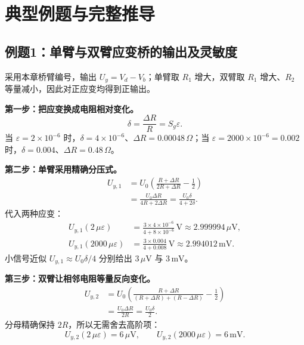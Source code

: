 \clearpage
\section{典型例题与完整推导}
\label{sec:ch5-worked-examples}

\subsection{例题1：单臂与双臂应变桥的输出及灵敏度}


\sol
采用本章桥臂编号，输出 $U_y=V_d-V_b$；单臂取 $R_1$ 增大，双臂取 $R_1$ 增大、$R_2$ 等量减小，因此对正应变均得到正输出。

\textbf{第一步：把应变换成电阻相对变化。}
\[
\delta=\frac{\Delta R}{R}=S_g\varepsilon.
\]
当 $\varepsilon=2\times10^{-6}$ 时，$\delta=4\times10^{-6}$、$\Delta R=0.00048\,\Omega$；当 $\varepsilon=2000\times10^{-6}=0.002$ 时，$\delta=0.004$、$\Delta R=0.48\,\Omega$。

\textbf{第二步：单臂采用精确分压式。}
\begin{align*}
U_{y,1}&=U_0\left(\frac{R+\Delta R}{2R+\Delta R}-\frac12\right)\\
&=\boxed{\frac{U_0\Delta R}{4R+2\Delta R}
=\frac{U_0\delta}{4+2\delta}}.
\end{align*}
代入两种应变：
\begin{align*}
U_{y,1}(2\,\mu\varepsilon)
&=\frac{3\times4\times10^{-6}}{4+8\times10^{-6}}\,\mathrm V
\approx\boxed{2.999994\,\mu\mathrm V},\\
U_{y,1}(2000\,\mu\varepsilon)
&=\frac{3\times0.004}{4+0.008}\,\mathrm V
\approx\boxed{2.994012\,\mathrm{mV}}.
\end{align*}
小信号近似 $U_{y,1}\approx U_0\delta/4$ 分别给出 $3\,\mu\mathrm V$ 与 $3\,\mathrm{mV}$。

\textbf{第三步：双臂让相邻电阻等量反向变化。}
\begin{align*}
U_{y,2}&=U_0\left(\frac{R+\Delta R}{(R+\Delta R)+(R-\Delta R)}-\frac12\right)\\
&=\boxed{\frac{U_0\Delta R}{2R}=\frac{U_0\delta}{2}}.
\end{align*}
分母精确保持 $2R$，所以无需舍去高阶项：
\[
\boxed{U_{y,2}(2\,\mu\varepsilon)=6\,\mu\mathrm V},\qquad
\boxed{U_{y,2}(2000\,\mu\varepsilon)=6\,\mathrm{mV}}.
\]

